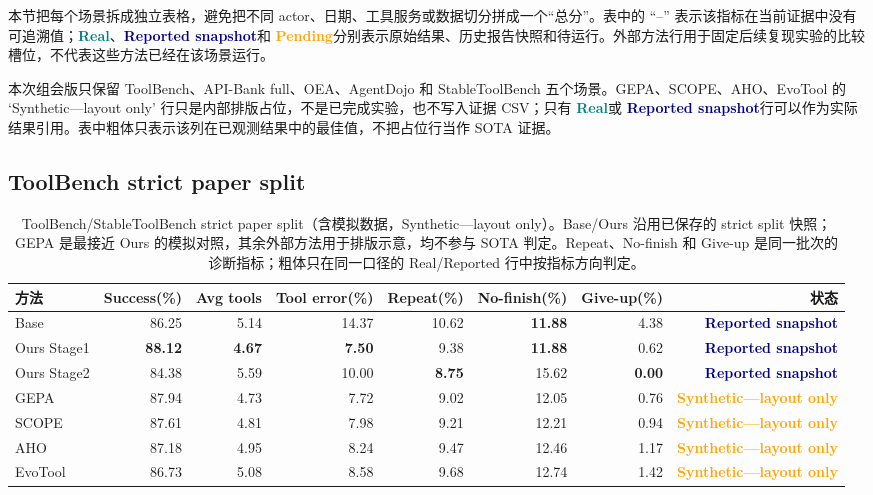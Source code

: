 \documentclass[a4paper,11pt]{article}
\newcommand{\real}{\textcolor{teal}{\textbf{Real}}}
\newcommand{\reported}{\textcolor{navy}{\textbf{Reported snapshot}}}
\newcommand{\pending}{\textcolor{orange}{\textbf{Pending}}}
\newcommand{\layoutonly}{\textcolor{orange}{\textbf{Synthetic---layout only}}}
\begin{document}
\begin{CJK*}{UTF8}{gbsn}
本节把每个场景拆成独立表格，避免把不同 actor、日期、工具服务或数据切分拼成一个“总分”。表中的 ``--'' 表示该指标在当前证据中没有可追溯值；\real、\reported 和 \pending 分别表示原始结果、历史报告快照和待运行。外部方法行用于固定后续复现实验的比较槽位，不代表这些方法已经在该场景运行。

\begin{sloppypar}
本次组会版只保留 ToolBench、API-Bank full、OEA、AgentDojo 和 StableToolBench 五个场景。GEPA、SCOPE、AHO、EvoTool 的 `Synthetic---layout only' 行只是内部排版占位，不是已完成实验，也不写入证据 CSV；只有 \real 或 \reported 行可以作为实际结果引用。表中粗体只表示该列在已观测结果中的最佳值，不把占位行当作 SOTA 证据。
\end{sloppypar}

\subsection{ToolBench strict paper split}

\begin{table}[H]
\centering\scriptsize
\caption{ToolBench/StableToolBench strict paper split（含模拟数据，Synthetic---layout only）。Base/Ours 沿用已保存的 strict split 快照；GEPA 是最接近 Ours 的模拟对照，其余外部方法用于排版示意，均不参与 SOTA 判定。Repeat、No-finish 和 Give-up 是同一批次的诊断指标；粗体只在同一口径的 Real/Reported 行中按指标方向判定。}
\begin{adjustbox}{max width=\textwidth}
\begin{tabular}{lrrrrrrr}
\toprule
方法 & Success(\%) & Avg tools & Tool error(\%) & Repeat(\%) & No-finish(\%) & Give-up(\%) & 状态\\
\midrule
Base & 86.25 & 5.14 & 14.37 & 10.62 & \textbf{11.88} & 4.38 & \reported\\
Ours Stage1 & \textbf{88.12} & \textbf{4.67} & \textbf{7.50} & 9.38 & \textbf{11.88} & 0.62 & \reported\\
Ours Stage2 & 84.38 & 5.59 & 10.00 & \textbf{8.75} & 15.62 & \textbf{0.00} & \reported\\
GEPA & 87.94 & 4.73 & 7.72 & 9.02 & 12.05 & 0.76 & \layoutonly\\
SCOPE & 87.61 & 4.81 & 7.98 & 9.21 & 12.21 & 0.94 & \layoutonly\\
AHO & 87.18 & 4.95 & 8.24 & 9.47 & 12.46 & 1.17 & \layoutonly\\
EvoTool & 86.73 & 5.08 & 8.58 & 9.68 & 12.74 & 1.42 & \layoutonly\\
\bottomrule
\end{tabular}
\end{adjustbox}
\end{table}


\end{CJK*}
\end{document}
